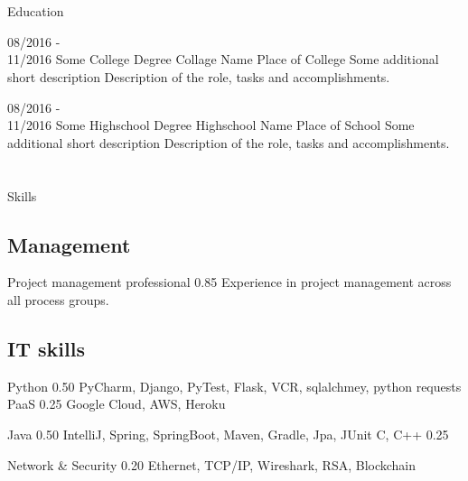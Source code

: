 \documentclass[12pt, letterpaper]{amin-cv}
\begin{document}
\section{\faBook}{Education}

\begin{entrylist}
	\entry
	{08/2016 -\\ 11/2016}
	{Some College Degree}
	{Collage Name}
	{Place of College}
	{Some additional short description}
	{Description of the role, tasks and accomplishments.}
	
	\entry
	{08/2016 -\\ 11/2016}
	{Some Highschool Degree}
	{Highschool Name}
	{Place of School}
	{Some additional short description}
	{Description of the role, tasks and accomplishments. \lipsum[2-2]}
	
	
	
\end{entrylist}

\newpage

\section{\faTasks}{Skills}

\subsection{Management}
\begin{entrylist}
	
	\entrySmall
	{Project management professional}
	{0.85}
	{Experience in project management across all process groups.}
	
\end{entrylist}

\subsection{IT skills}
\begin{entrylist}
	
	\entrySmallDouble
	{Python}
	{0.50}
	{PyCharm, Django, PyTest, Flask, VCR, sqlalchmey, python requests}
	{PaaS}
	{0.25}
	{Google Cloud, AWS, Heroku}
	
	\entrySmallDouble
	{Java}
	{0.50}
	{IntelliJ, Spring, SpringBoot, Maven, Gradle, Jpa, JUnit}
	{C, C++}
	{0.25}
	{}
	
	\entrySmall
	{Network \& Security}
	{0.20}
	{Ethernet, TCP/IP, Wireshark, RSA, Blockchain}
	
\end{entrylist}
\end{document}
